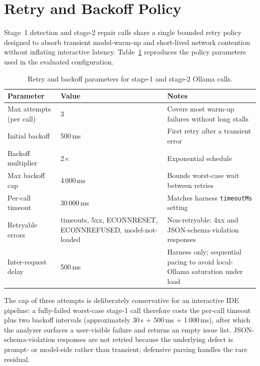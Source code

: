 \section{Retry and Backoff Policy}
\label{app:retry-policy}

Stage~1 detection and stage-2 repair calls share a single bounded retry policy designed to absorb transient model-warm-up and short-lived network contention without inflating interactive latency. Table~\ref{tab:app-retry-params} reproduces the policy parameters used in the evaluated configuration.

\begin{table}[H]
\centering
\caption{Retry and backoff parameters for stage-1 and stage-2 Ollama calls.}
\label{tab:app-retry-params}
\footnotesize
\renewcommand{\arraystretch}{1.2}
\begin{tabularx}{\textwidth}{p{}p{}X}
\toprule
\textbf{Parameter} & \textbf{Value} & \textbf{Notes} \\
\midrule
Max attempts (per call)     & 3                  & Covers most warm-up failures without long stalls \\
Initial backoff             & 500\,ms            & First retry after a transient error \\
Backoff multiplier          & 2$\times$          & Exponential schedule \\
Max backoff cap             & 4\,000\,ms         & Bounds worst-case wait between retries \\
Per-call timeout            & 30\,000\,ms        & Matches harness \texttt{timeoutMs} setting \\
Retryable errors            & timeouts, 5xx, ECONNRESET, ECONNREFUSED, model-not-loaded & Non-retryable: 4xx and JSON-schema-violation responses \\
Inter-request delay         & 500\,ms            & Harness only; sequential pacing to avoid local-Ollama saturation under load \\
\bottomrule
\end{tabularx}
\end{table}

The cap of three attempts is deliberately conservative for an interactive IDE pipeline: a fully-failed worst-case stage-1 call therefore costs the per-call timeout plus two backoff intervals (approximately 30\,s + 500\,ms + 1\,000\,ms), after which the analyzer surfaces a user-visible failure and returns an empty issue list. JSON-schema-violation responses are not retried because the underlying defect is prompt- or model-side rather than transient; defensive parsing handles the rare residual.

